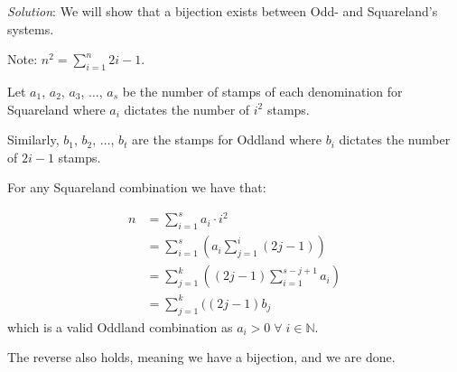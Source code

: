\documentclass{article}
\begin{document}
\begin{enumerate}[1.]
\textit{Solution}: 
We will show that a bijection exists between Odd- and Squareland's systems.

Note: $n^2 = \sum_{i = 1}^{n}2i - 1$.

Let $a_1$, $a_2$, $a_3$, $\dots$, $a_s$ be the number of stamps of each denomination for Squareland where $a_i$ dictates the number of $i^2$ stamps.

Similarly, $b_1$, $b_2$, $\dots$, $b_t$ are the stamps for Oddland where $b_i$ dictates the number of $2i - 1$ stamps.

For any Squareland combination we have that:

\begin{align*}
	n &= \sum_ {i = 1}^{s} a_i \cdot i^2 \\
	&= \sum_ {i = 1}^{s} (a_i \sum_{j = 1}^{i} (2j - 1) ) \\
	&= \sum_ {j = 1}^{k} ((2j - 1) \sum_{i = 1}^{s - j + 1}a_i) \\
	&= \sum_ {j = 1}^{k} ((2j - 1) b_j 
\end{align*}
which is a valid Oddland combination as $a_i > 0 \;\forall\; i \in \mathbb{N}$.

The reverse also holds, meaning we have a bijection, and we are done.

\end{enumerate}
\end{document}
